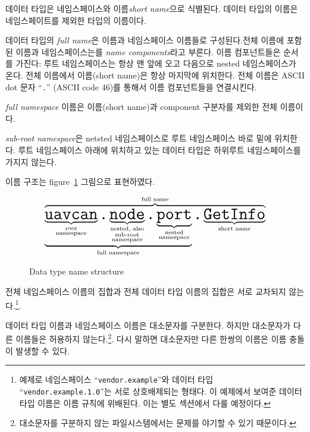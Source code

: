 데이터 타입은 네임스페이스와 이름\emph{short name}으로 식별된다.
데이터 타입의 이름은 네임스페이트를 제외한 타입의 이름이다.

데이터 타입의 \emph{full name}은 이름과 네임스페이스 이름들로 구성된다.전체 이름에 포함된 이름과 네임스페이스는를 \emph{name components}라고 부른다.
이름 컴포넌트들은 순서를 가진다: 루트 네임스페이스는 항상 맨 앞에 오고 다음으로 nested 네임스페이스가 온다.
전체 이름에서 이름(short name)은 항상 마지막에 위치한다.
전체 이름은 ASCII dot 문자 ``\verb|.|'' (ASCII code 46)를 통해서 이름 컴포넌트들을 연결시킨다.

\emph{full namespace} 이름은 이름(short name)과 component 구분자를 제외한 전체 이름이다.

\emph{sub-root namespace}은 netsted 네임스페이스로 루트 네임스페이스 바로 밑에 위치한다.
루트 네임스페이스 아래에 위치하고 있는 데이터 타입은 하위루트 네임스페이스를 가지지 않는다.

이름 구조는 figure~\ref{fig:dsdl_data_type_name_structure} 그림으로 표현하였다.

\begin{figure}[H]
    $$
    \overbrace{
        \underbrace{
            \underbrace{\texttt{\huge{uavcan}}}_{\substack{\text{root} \\ \text{namespace}}}%
            \texttt{\huge{.}}%
            \underbrace{\texttt{\huge{node}}}_{\substack{\text{nested, also} \\ \text{sub-root} \\ \text{namespace}}}%
            \texttt{\huge{.}}%
            \underbrace{\texttt{\huge{port}}}_{\substack{\text{nested} \\ \text{namespace}}}%
        }_{\text{full namespace}}%
        \texttt{\huge{.}}%
        \underbrace{\texttt{\huge{GetInfo}}}_{\text{short name}}
    }^{\text{full name}}
    $$
    \caption{Data type name structure\label{fig:dsdl_data_type_name_structure}}
\end{figure}

전체 네임스페이스 이름의 집합과 전체 데이터 타입 이름의 집합은 서로 교차되지 않는다.\footnote{%
    예제로 네임스페이스 ``\texttt{vendor.example}''와 데이터 타입 ``\texttt{vendor.example.1.0}''는 서로 상호배제되는 형태다.
    이 예제에서 보여준 데이터 타입 이름은 이름 규칙에 위배된다. 이는 별도 섹션에서 다룰 예정이다.
}.

데이터 타입 이름과 네임스페이스 이름은 대소문자를 구분한다.
하지만 대소문자가 다른 이름들은 허용하지 않는다.\footnote{%
    대소문자를 구분하지 않는 파일시스템에서는 문제를 야기할 수 있기 때문이다.
}.
다시 말하면 대소문자만 다른 한쌍의 이름은 이름 충돌이 발생할 수 있다.


